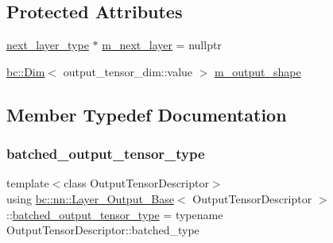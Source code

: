 \subsection*{Protected Attributes}
\begin{DoxyCompactItemize}
\item 
\hyperlink{structbc_1_1nn_1_1Layer__Output__Base_a0c791bc57bcc78e8d82e8a5375f1c584}{next\+\_\+layer\+\_\+type} $\ast$ \hyperlink{structbc_1_1nn_1_1Layer__Output__Base_a276a95f894d4b93e834a105b3566ebf5}{m\+\_\+next\+\_\+layer} = nullptr
\item 
\hyperlink{structbc_1_1Dim}{bc\+::\+Dim}$<$ output\+\_\+tensor\+\_\+dim\+::value $>$ \hyperlink{structbc_1_1nn_1_1Layer__Output__Base_a3cc4d51833f2a19f4f6dc751727a7a2c}{m\+\_\+output\+\_\+shape}
\end{DoxyCompactItemize}


\subsection{Member Typedef Documentation}
\mbox{\label{structbc_1_1nn_1_1Layer__Output__Base_a1de6ba739a49078d6cc6d169e85e8d4f}} 
\subsubsection{\texorpdfstring{batched\+\_\+output\+\_\+tensor\+\_\+type}{batched\_output\_tensor\_type}\hspace{0.1cm}{\footnotesize\ttfamily [1/2]}}
{\footnotesize\ttfamily template$<$class Output\+Tensor\+Descriptor$>$ \\
using \hyperlink{structbc_1_1nn_1_1Layer__Output__Base}{bc\+::nn\+::\+Layer\+\_\+\+Output\+\_\+\+Base}$<$ Output\+Tensor\+Descriptor $>$\+::\hyperlink{structbc_1_1nn_1_1Layer__Output__Base_a1de6ba739a49078d6cc6d169e85e8d4f}{batched\+\_\+output\+\_\+tensor\+\_\+type} =  typename Output\+Tensor\+Descriptor\+::batched\+\_\+type}

\mbox{\label{structbc_1_1nn_1_1Layer__Output__Base_a1de6ba739a49078d6cc6d169e85e8d4f}} 
